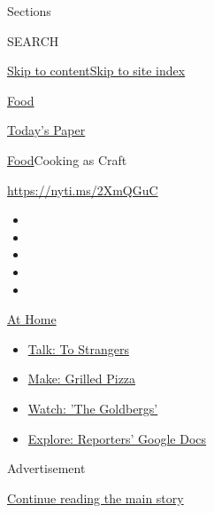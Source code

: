 Sections

SEARCH

\protect\hyperlink{site-content}{Skip to
content}\protect\hyperlink{site-index}{Skip to site index}

\href{https://www.nytimes.com/section/food}{Food}

\href{https://myaccount.nytimes.com/auth/login?response_type=cookie\&client_id=vi}{}

\href{https://www.nytimes.com/section/todayspaper}{Today's Paper}

\href{/section/food}{Food}\textbar{}Cooking as Craft

\url{https://nyti.ms/2XmQGuC}

\begin{itemize}
\item
\item
\item
\item
\item
\end{itemize}

\href{https://www.nytimes.com/spotlight/at-home?action=click\&pgtype=Article\&state=default\&region=TOP_BANNER\&context=at_home_menu}{At
Home}

\begin{itemize}
\tightlist
\item
  \href{https://www.nytimes.com/2020/08/03/well/family/the-benefits-of-talking-to-strangers.html?action=click\&pgtype=Article\&state=default\&region=TOP_BANNER\&context=at_home_menu}{Talk:
  To Strangers}
\item
  \href{https://www.nytimes.com/2020/08/01/at-home/coronavirus-make-pizza-on-a-grill.html?action=click\&pgtype=Article\&state=default\&region=TOP_BANNER\&context=at_home_menu}{Make:
  Grilled Pizza}
\item
  \href{https://www.nytimes.com/2020/07/31/arts/television/goldbergs-abc-stream.html?action=click\&pgtype=Article\&state=default\&region=TOP_BANNER\&context=at_home_menu}{Watch:
  'The Goldbergs'}
\item
  \href{https://www.nytimes.com/interactive/2020/at-home/even-more-reporters-editors-diaries-lists-recommendations.html?action=click\&pgtype=Article\&state=default\&region=TOP_BANNER\&context=at_home_menu}{Explore:
  Reporters' Google Docs}
\end{itemize}

Advertisement

\protect\hyperlink{after-top}{Continue reading the main story}

